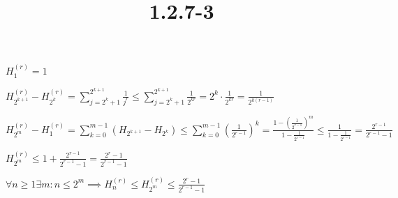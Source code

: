 \documentclass{article}
\title{1.2.7-3}
\begin{document}
\maketitle

\( H_1^{(r)} = 1 \)

\( H_{2^{k+1}}^{(r)} - H_{2^{k}}^{(r)} = \sum_{j=2^{k}+1}^{2^{k+1}} \frac{1}{j^r} \leq \sum_{j=2^{k}+1}^{2^{k+1}} \frac{1}{2^{kr}} = 2^{k} \cdot \frac{1}{2^{kr}} = \frac{1}{2^{k(r-1)}} \)

\( H_{2^m}^{(r)} - H_1^{(r)} = \sum_{k=0}^{m-1} (H_{2^{k+1}}-H_{2^{k}}) \leq \sum_{k=0}^{m-1}(\frac{1}{2^{r-1}})^k = \frac{1-(\frac{1}{2^{r-1}})^m}{1 - \frac{1}{2^{r-1}}} \leq \frac{1}{1 - \frac{1}{2^{r-1}}} = \frac{2^{r-1}}{2^{r-1} - 1} \)

\( H_{2^m}^{(r)} \leq 1 + \frac{2^{r-1}}{2^{r-1} - 1} = \frac{2^r - 1}{2^{r-1} - 1} \)

\( \forall n \geq 1 \exists m: n \leq 2^m \implies H_n^{(r)} \leq H_{2^m}^{(r)} \leq \frac{2^{r}-1}{2^{r-1} - 1} \)
\end{document}
